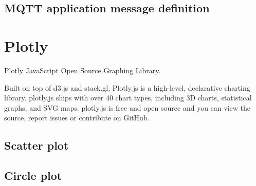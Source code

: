 \documentclass[\main/main.tex]{subfiles}
\begin{document}
\subsection*{MQTT application message definition}

\section{Plotly}
Plotly JavaScript Open Source Graphing Library.

Built on top of d3.js and stack.gl, Plotly.js is a high-level, declarative charting library. plotly.js ships with over 40 chart types, including 3D charts, statistical graphs, and SVG maps.
plotly.js is free and open source and you can view the source, report issues or contribute on GitHub. \cite{web_plotly}

\subsection{Scatter plot}

\subsection{Circle plot}
\bib
\end{document}
